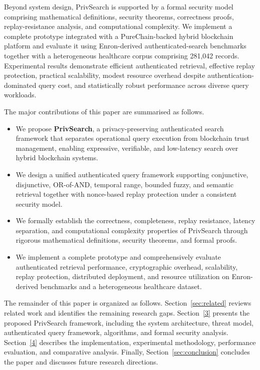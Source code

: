 Beyond system design, PrivSearch is supported by a formal security model comprising mathematical definitions, security theorems, correctness proofs, replay-resistance analysis, and computational complexity. We implement a complete prototype integrated with a PureChain-backed hybrid blockchain platform and evaluate it using Enron-derived authenticated-search benchmarks together with a heterogeneous healthcare corpus comprising 281,042 records. Experimental results demonstrate efficient authenticated retrieval, effective replay protection, practical scalability, modest resource overhead despite authentication-dominated query cost, and statistically robust performance across diverse query workloads.

The major contributions of this paper are summarised as follows.

\begin{itemize}
\item We propose \textbf{PrivSearch}, a privacy-preserving authenticated search framework that separates operational query execution from blockchain trust management, enabling expressive, verifiable, and low-latency search over hybrid blockchain systems.
\item We design a unified authenticated query framework supporting conjunctive, disjunctive, OR-of-AND, temporal range, bounded fuzzy, and semantic retrieval together with nonce-based replay protection under a consistent security model.
\item We formally establish the correctness, completeness, replay resistance, latency separation, and computational complexity properties of PrivSearch through rigorous mathematical definitions, security theorems, and formal proofs.
\item We implement a complete prototype and comprehensively evaluate authenticated retrieval performance, cryptographic overhead, scalability, replay protection, distributed deployment, and resource utilization on Enron-derived benchmarks and a heterogeneous healthcare dataset.
\end{itemize}

The remainder of this paper is organized as follows. Section~\ref{sec:related} reviews related work and identifies the remaining research gaps. Section~\ref{3} presents the proposed PrivSearch framework, including the system architecture, threat model, authenticated query framework, algorithms, and formal security analysis. Section~\ref{4} describes the implementation, experimental methodology, performance evaluation, and comparative analysis. Finally, Section~\ref{sec:conclusion} concludes the paper and discusses future research directions.
